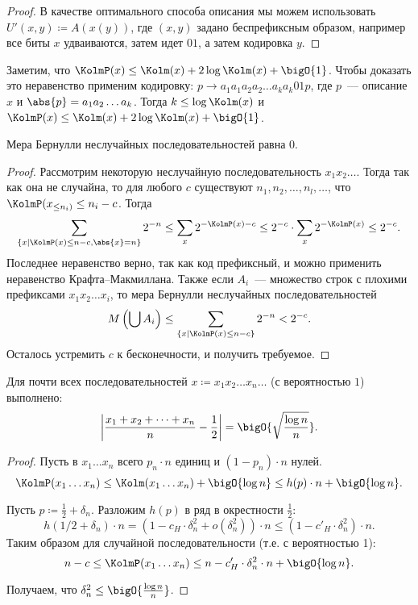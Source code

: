 \begin{proof}
    В качестве оптимального способа описания мы можем использовать $U'(x, y) \coloneqq A(x(y))$, где $(x,
    y)$ задано беспрефиксным образом, например все биты $x$ удваиваются, затем идет $01$, а затем
    кодировка $y$.
\end{proof}

Заметим, что $\KolmP(x) \le \Kolm(x) + 2 \log \Kolm(x) + \bigO{1}$. Чтобы доказать это неравенство
применим кодировку: $p \to a_1a_1a_2a_2 \ldots a_ka_k01p$, где $p$~--- описание $x$ и $\abs{p} =
a_1a_2\ldots a_k$. Тогда $k \leq \log \Kolm(x)$ и $\KolmP(x) \le \Kolm(x) + 2\log \Kolm(x) +
\bigO{1}$.

\begin{theorem}
    Мера Бернулли неслучайных последовательностей равна $0$. 
\end{theorem}

\begin{proof}
    Рассмотрим некоторую неслучайную последовательность $x_1x_2\ldots$. Тогда так как она не случайна, то
    для любого $c$ существуют $n_1,n_2, \ldots,n_l, \ldots$, что $\KolmP(x_{\leq n_i)} \leq n_i -
    c$. Тогда
    $$
        \sum\limits_{\{x \mid \KolmP(x) \le n - c, \abs{x} = n\}} 2^{-n} \leq
        \sum_x 2^{-\KolmP(x) - c} \le 2^{-c} \cdot \sum_x 2^{-\KolmP(x)} \le 2^{-c}.
    $$
    Последнее неравенство верно, так как код префиксный, и можно применить неравенство
    Крафта--Макмиллана. Также если $A_i$~--- множество строк с плохими префиксами $x_1x_2\ldots x_i$, то
    мера Бернулли неслучайных последовательностей
    $$
        M\left(\bigcup A_i\right) \leq \sum_{\{x \mid \KolmP(x) \le n - c\}} 2^{-n} < 2^{-c}.
    $$
    Осталось устремить $c$ к бесконечности, и получить требуемое.    
\end{proof}

\begin{theorem}
    Для почти всех последовательностей $x \coloneqq  x_1x_2 \dots x_n \dots$ (с вероятностью $1$)
    выполнено:
    $$
        \left|\frac{x_1 + x_2 + \dots + x_n}{n} - \frac{1}{2}\right| =
        \bigO{\sqrt{\frac{\log n}{n}}}. 
    $$
\end{theorem}

\begin{proof}
    Пусть в $x_1 \dots x_n$ всего $p_n \cdot n$ единиц и $(1 - p_n) \cdot n$ нулей.
    $$
        \KolmP(x_1 \dots x_n) \le \Kolm(x_1 \dots x_n) + \bigO{\log n} \le h(p) \cdot n + \bigO{\log n}.
    $$

    
    Пусть $p \coloneqq \frac{1}{2} + \delta_n$. Разложим $h(p)$ в ряд в окрестности $\frac{1}{2}$:
    $$ 
        h(1 / 2 + \delta_n) \cdot n = (1 - c_H \cdot \delta_n^2 + o(\delta_n^2)) \cdot n \le
        (1 - c'_H \cdot \delta_n^2) \cdot n.
    $$
    Таким образом для случайной последовательности (т.е. с вероятностью 1):
    $$
        n - c \le \KolmP(x_1 \dots x_n) \le n - c'_H \cdot \delta_n^2 \cdot n + \bigO{\log n}.
    $$

    Получаем, что $\delta_n^2 \le \bigO{\frac{\log n}{n}}$.
\end{proof}
